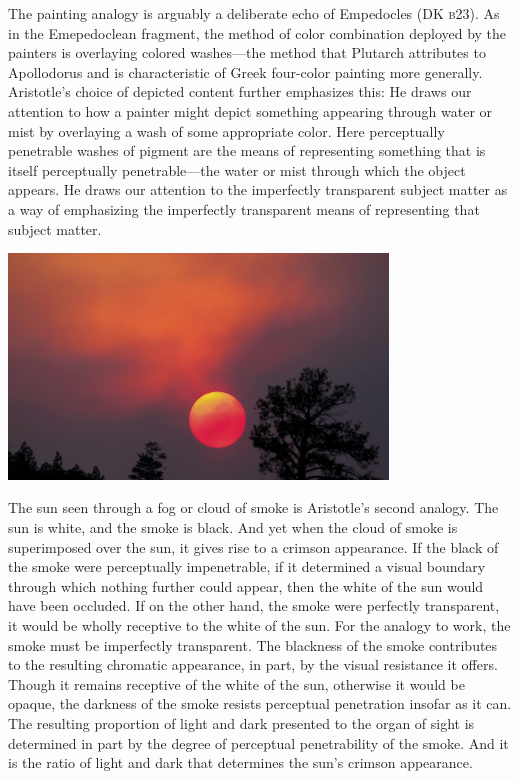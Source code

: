 The painting analogy is arguably a deliberate echo of Empedocles (DK \textsc{b}23). As in the Emepedoclean fragment, the method of color combination deployed by the painters is overlaying colored washes---the method that Plutarch attributes to Apollodorus and is characteristic of Greek four-color painting more generally. Aristotle's choice of depicted content further emphasizes this: He draws our attention to how a painter might depict something appearing through water or mist by overlaying a wash of some appropriate color. Here perceptually penetrable washes of pigment are the means of representing something that is itself perceptually penetrable---the water or mist through which the object appears. He draws our attention to the imperfectly transparent subject matter as a way of emphasizing the imperfectly transparent means of representing that subject matter. \change

\begin{frame}
	\begin{center}
		\includegraphics[height=6cm]{../../graphics/red_sun.jpg}
	\end{center}
\end{frame}

The sun seen through a fog or cloud of smoke is Aristotle's second analogy. The sun is white, and the smoke is black. And yet when the cloud of smoke is superimposed over the sun, it gives rise to a crimson appearance. If the black of the smoke were perceptually impenetrable, if it determined a visual boundary through which nothing further could appear, then the white of the sun would have been occluded. If on the other hand, the smoke were perfectly transparent, it would be wholly receptive to the white of the sun. For the analogy to work, the smoke must be imperfectly transparent. The blackness of the smoke contributes to the resulting chromatic appearance, in part, by the visual resistance it offers. Though it remains receptive of the white of the sun, otherwise it would be opaque, the darkness of the smoke resists perceptual penetration insofar as it can. The resulting proportion of light and dark presented to the organ of sight is determined in part by the degree of perceptual penetrability of the smoke. And it is the ratio of light and dark that determines the sun's crimson appearance.

